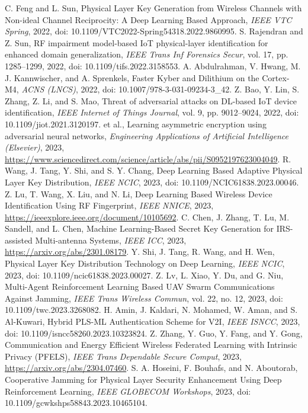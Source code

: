 C. Feng and L. Sun, Physical Layer Key Generation from Wireless Channels with Non-ideal Channel Reciprocity: A Deep Learning Based Approach, \emph{IEEE VTC Spring}, 2022, doi: 10.1109/VTC2022-Spring54318.2022.9860995.
S. Rajendran and Z. Sun, RF impairment model-based IoT physical-layer identification for enhanced domain generalization, \emph{IEEE Trans Inf Forensics Secur}, vol. 17, pp. 1285--1299, 2022, doi: 10.1109/tifs.2022.3158553.
A. Abdulrahman, V. Hwang, M. J. Kannwischer, and A. Sprenkels, Faster Kyber and Dilithium on the Cortex-M4, \emph{ACNS (LNCS)}, 2022, doi: 10.1007/978-3-031-09234-3\_42.
Z. Bao, Y. Lin, S. Zhang, Z. Li, and S. Mao, Threat of adversarial attacks on DL-based IoT device identification, \emph{IEEE Internet of Things Journal}, vol. 9, pp. 9012--9024, 2022, doi: 10.1109/jiot.2021.3120197.
et al., Learning asymmetric encryption using adversarial neural networks, \emph{Engineering Applications of Artificial Intelligence (Elsevier)}, 2023, \url{https://www.sciencedirect.com/science/article/abs/pii/S0952197623004049}.
R. Wang, J. Tang, Y. Shi, and S. Y. Chang, Deep Learning Based Adaptive Physical Layer Key Distribution, \emph{IEEE NCIC}, 2023, doi: 10.1109/NCIC61838.2023.00046.
Z. Lu, T. Wang, X. Liu, and N. Li, Deep Learning Based Wireless Device Identification Using RF Fingerprint, \emph{IEEE NNICE}, 2023, \url{https://ieeexplore.ieee.org/document/10105692}.
C. Chen, J. Zhang, T. Lu, M. Sandell, and L. Chen, Machine Learning-Based Secret Key Generation for IRS-assisted Multi-antenna Systems, \emph{IEEE ICC}, 2023, \url{https://arxiv.org/abs/2301.08179}.
Y. Shi, J. Tang, R. Wang, and H. Wen, Physical Layer Key Distribution Technology on Deep Learning, \emph{IEEE NCIC}, 2023, doi: 10.1109/ncic61838.2023.00027.
Z. Lv, L. Xiao, Y. Du, and G. Niu, Multi-Agent Reinforcement Learning Based UAV Swarm Communications Against Jamming, \emph{IEEE Trans Wireless Commun}, vol. 22, no. 12, 2023, doi: 10.1109/twc.2023.3268082.
H. Amin, J. Kaldari, N. Mohamed, W. Aman, and S. Al-Kuwari, Hybrid PLS-ML Authentication Scheme for V2I, \emph{IEEE ISNCC}, 2023, doi: 10.1109/isncc58260.2023.10323824.
Z. Zhang, Y. Guo, Y. Fang, and Y. Gong, Communication and Energy Efficient Wireless Federated Learning with Intrinsic Privacy (PFELS), \emph{IEEE Trans Dependable Secure Comput}, 2023, \url{https://arxiv.org/abs/2304.07460}.
S. A. Hoseini, F. Bouhafs, and N. Aboutorab, Cooperative Jamming for Physical Layer Security Enhancement Using Deep Reinforcement Learning, \emph{IEEE GLOBECOM Workshops}, 2023, doi: 10.1109/gcwkshps58843.2023.10465104.
